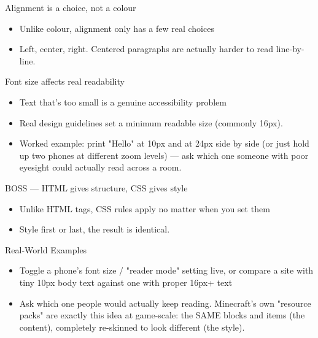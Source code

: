 \documentclass[aspectratio=169]{beamer}
\begin{document}
\begin{frame}{Alignment is a choice, not a colour}
    \large
    \begin{itemize}
        \item Unlike colour, alignment only has a few real choices
        \item Left, center, right. Centered paragraphs are actually harder to read line-by-line.
    \end{itemize}
\end{frame}


\begin{frame}{Font size affects real readability}
    \large
    \begin{itemize}
        \item Text that's too small is a genuine accessibility problem
        \item Real design guidelines set a minimum readable size (commonly 16px).
        \item Worked example: print "Hello" at 10px and at 24px side by side (or just hold up two phones at different zoom levels) — ask which one someone with poor eyesight could actually read across a room.
    \end{itemize}
\end{frame}


\begin{frame}{BOSS — HTML gives structure, CSS gives style}
    \large
    \begin{itemize}
        \item Unlike HTML tags, CSS rules apply no matter when you set them
        \item Style first or last, the result is identical.
    \end{itemize}
\end{frame}

\begin{frame}{Real-World Examples}
    \large
    \begin{itemize}
        \item Toggle a phone's font size / "reader mode" setting live, or compare a site with tiny 10px body text against one with proper 16px+ text
        \item Ask which one people would actually keep reading. Minecraft's own "resource packs" are exactly this idea at game-scale: the SAME blocks and items (the content), completely re-skinned to look different (the style).
    \end{itemize}
\end{frame}
\end{document}
